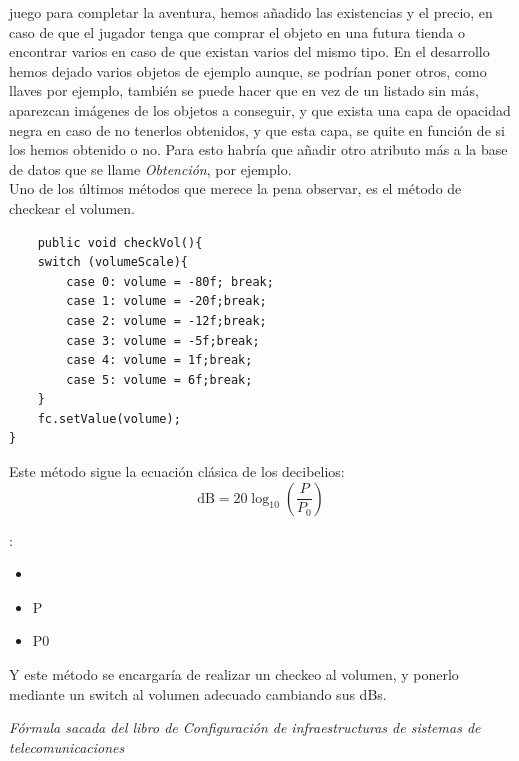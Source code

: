 \documentclass[a4paper]{article}
\begin{document}
juego para completar la aventura, hemos añadido las existencias y el precio, en caso de que el jugador tenga que comprar el objeto en una futura tienda o encontrar varios en caso de que existan varios del mismo tipo.
En el desarrollo hemos dejado varios objetos de ejemplo aunque, se podrían poner otros, como llaves por ejemplo, también se puede hacer que en vez de un listado sin más, aparezcan imágenes de los objetos a conseguir, y que exista una capa de opacidad negra en caso de no tenerlos obtenidos, 
y que esta capa, se quite en función de si los hemos obtenido o no. Para esto habría que añadir otro atributo más a la base de datos que se llame \textit{Obtención}, por ejemplo.\\
\clearpage
Uno de los últimos métodos que merece la pena observar, es el método de checkear el volumen.
\begin{lstlisting}
    public void checkVol(){
    switch (volumeScale){
        case 0: volume = -80f; break;
        case 1: volume = -20f;break;
        case 2: volume = -12f;break;
        case 3: volume = -5f;break;
        case 4: volume = 1f;break;
        case 5: volume = 6f;break;
    }
    fc.setValue(volume);
}
\end{lstlisting}
Este método sigue la ecuación clásica de los decibelios:\\
\[
\text{dB} = 20 \log_{10} \left( \frac{P}{P_0} \right)
\]

:

\begin{itemize}
    \item {} 
    \item P 
    \item P0 
\end{itemize}
Y este método se encargaría de realizar un checkeo al volumen, y ponerlo mediante un switch al volumen adecuado cambiando sus dBs.

\begin{flushright}
    \textit{Fórmula sacada del libro de Configuración de infraestructuras de sistemas de telecomunicaciones}
\end{flushright}
\clearpage
\end{document}
